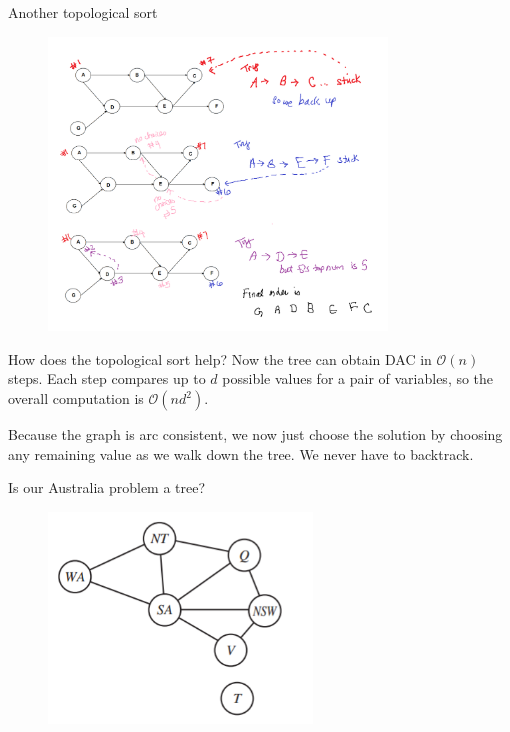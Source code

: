 \documentclass{beamer}
\begin{document}
\begin{frame}{Another topological sort}

    \begin{figure}
        \includegraphics[width=9cm]{images/top_sort_1}
    \end{figure}
    
\end{frame}

\begin{frame}{How does the topological sort help?}
    Now the tree can obtain DAC in $\mathcal{O}(n)$ steps. Each step compares up to $d$ possible values for a pair of variables, so the overall computation is 
    $\mathcal{O}(nd^2)$.

    \vspace{0.1in}
    Because the graph is arc consistent, we now just choose the solution by choosing any remaining value as we walk down the tree. We never have to backtrack.
    
\end{frame}

\begin{frame}{Is our Australia problem a tree?}
    \begin{figure}
        \includegraphics[width=7cm]{images/map_graph}
    \end{figure}
    
\end{frame}
\end{document}
